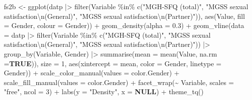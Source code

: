 \documentclass[
  bookmarksnumbered]{article}
\newenvironment{Shaded}{\begin{snugshade}}{\end{snugshade}}
\newcommand{\AttributeTok}[1]{\textcolor[rgb]{0.80,0.80,0.80}{#1}}
\newcommand{\ConstantTok}[1]{\textcolor[rgb]{0.86,0.64,0.64}{\textbf{#1}}}
\newcommand{\DecValTok}[1]{\textcolor[rgb]{0.86,0.86,0.80}{#1}}
\newcommand{\FloatTok}[1]{\textcolor[rgb]{0.75,0.75,0.82}{#1}}
\newcommand{\FunctionTok}[1]{\textcolor[rgb]{0.94,0.94,0.56}{#1}}
\newcommand{\NormalTok}[1]{\textcolor[rgb]{0.80,0.80,0.80}{#1}}
\newcommand{\OtherTok}[1]{\textcolor[rgb]{0.94,0.94,0.56}{#1}}
\newcommand{\SpecialCharTok}[1]{\textcolor[rgb]{0.86,0.64,0.64}{#1}}
\newcommand{\StringTok}[1]{\textcolor[rgb]{0.80,0.58,0.58}{#1}}
\begin{document}
\begin{Shaded}
\begin{Highlighting}[]
\NormalTok{fs2b }\OtherTok{\textless{}{-}} \FunctionTok{ggplot}\NormalTok{(datp }\SpecialCharTok{|\textgreater{}}
                 \FunctionTok{filter}\NormalTok{(Variable }\SpecialCharTok{\%in\%} \FunctionTok{c}\NormalTok{(}\StringTok{"MGH{-}SFQ (total)"}\NormalTok{,}
                                        \StringTok{"MGSS sexual satisfaction}\SpecialCharTok{\textbackslash{}n}\StringTok{(General)"}\NormalTok{,}
                                        \StringTok{"MGSS sexual satisfaction}\SpecialCharTok{\textbackslash{}n}\StringTok{(Partner)"}\NormalTok{)),}
             \FunctionTok{aes}\NormalTok{(Value,}
                 \AttributeTok{fill =}\NormalTok{ Gender,}
                 \AttributeTok{colour =}\NormalTok{ Gender)) }\SpecialCharTok{+}
        \FunctionTok{geom\_density}\NormalTok{(}\AttributeTok{alpha =} \FloatTok{0.3}\NormalTok{) }\SpecialCharTok{+}
        \FunctionTok{geom\_vline}\NormalTok{(}\AttributeTok{data =}\NormalTok{ datp }\SpecialCharTok{|\textgreater{}}
                     \FunctionTok{filter}\NormalTok{(Variable }\SpecialCharTok{\%in\%} \FunctionTok{c}\NormalTok{(}\StringTok{"MGH{-}SFQ (total)"}\NormalTok{,}
                                            \StringTok{"MGSS sexual satisfaction}\SpecialCharTok{\textbackslash{}n}\StringTok{(General)"}\NormalTok{,}
                                            \StringTok{"MGSS sexual satisfaction}\SpecialCharTok{\textbackslash{}n}\StringTok{(Partner)"}\NormalTok{)) }\SpecialCharTok{|\textgreater{}} 
                     \FunctionTok{group\_by}\NormalTok{(Variable, Gender) }\SpecialCharTok{|\textgreater{}}
                     \FunctionTok{summarise}\NormalTok{(}\AttributeTok{mean =} \FunctionTok{mean}\NormalTok{(Value, }\AttributeTok{na.rm =}\ConstantTok{TRUE}\NormalTok{)),}
                   \AttributeTok{size =} \DecValTok{1}\NormalTok{,}
                   \FunctionTok{aes}\NormalTok{(}\AttributeTok{xintercept =}\NormalTok{ mean, }\AttributeTok{color =}\NormalTok{ Gender, }\AttributeTok{linetype =}\NormalTok{ Gender)) }\SpecialCharTok{+}
        \FunctionTok{scale\_color\_manual}\NormalTok{(}\AttributeTok{values =}\NormalTok{ color.Gender) }\SpecialCharTok{+}
        \FunctionTok{scale\_fill\_manual}\NormalTok{(}\AttributeTok{values =}\NormalTok{ color.Gender) }\SpecialCharTok{+}
        \FunctionTok{facet\_wrap}\NormalTok{(}\SpecialCharTok{\textasciitilde{}}\NormalTok{ Variable,}
                   \AttributeTok{scales =} \StringTok{"free"}\NormalTok{,}
                   \AttributeTok{ncol =} \DecValTok{3}\NormalTok{) }\SpecialCharTok{+}
        \FunctionTok{labs}\NormalTok{(}\AttributeTok{y =} \StringTok{"Density"}\NormalTok{,}
             \AttributeTok{x =} \ConstantTok{NULL}\NormalTok{) }\SpecialCharTok{+}
        \FunctionTok{theme\_tq}\NormalTok{()}


\end{Highlighting}
\end{Shaded}
\end{document}

